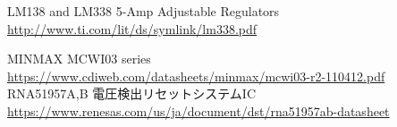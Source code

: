 \begin{thebibliography}{2}
  LM138 and LM338 5-Amp Adjustable Regulators
  \url{http://www.ti.com/lit/ds/symlink/lm338.pdf}

  MINMAX MCWI03 series
  \url{https://www.cdiweb.com/datasheets/minmax/mcwi03-r2-110412.pdf}
  RNA51957A,B 電圧検出リセットシステムIC
  \url{https://www.renesas.com/us/ja/document/dst/rna51957ab-datasheet}


\end{thebibliography}

